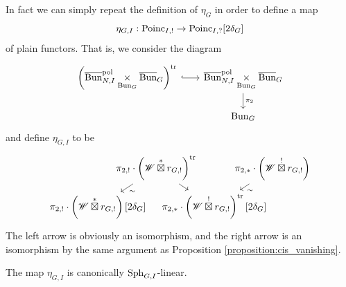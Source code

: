 \subsubsection{} In fact we can simply repeat the definition of $\eta_G$ in order to define a map
  \[\eta_{G,I} : \mathrm{Poinc}_{I,!} \to \mathrm{Poinc}_{I,?} [2\delta_G]\]
of plain functors. That is, we consider the diagram
\[
\begin{tikzcd}[
  column sep={12em,between origins},
  row sep={4em,between origins}
]
  \left( \Bunc_{N,I}^\pol \underset{\Bun_G}{\times} \Bunc_G \right)^\trans \arrow[r, hook] & \Bunc_{N,I}^\pol \underset{\Bun_G}{\times} \Bunc_G \arrow[d, "\pi_2"] \\
   & \Bun_G
\end{tikzcd}
\]
and define $\eta_{G,I}$ to be
\[
\begin{tikzcd}[
  column sep={6em,between origins},
  row sep={4em,between origins}
]
  & \pi_{2, !} \cdot \left( \WW \stoximes r_{G,!} \right)^\trans \arrow[dr] \arrow[dl, "\sim"] & & \pi_{2, *} \cdot \left( \WW \shoximes r_{G,!} \right) \arrow[dl, "\sim"] \\
  \pi_{2, !} \cdot \left( \WW \stoximes r_{G,!} \right) [2\delta_G] & & \pi_{2, *} \cdot \left( \WW \shoximes r_{G,!} \right)^\trans [2\delta_G]&
\end{tikzcd}
\]
The left arrow is obviously an isomorphism, and the right arrow is an isomorphism by the same argument as Proposition \ref{proposition:cis_vanishing}.

\begin{proposition}
\label{proposition:Sph_linear}
The map $\eta_{G,I}$ is canonically $\mathrm{Sph}_{G,I}$-linear.
\end{proposition}


